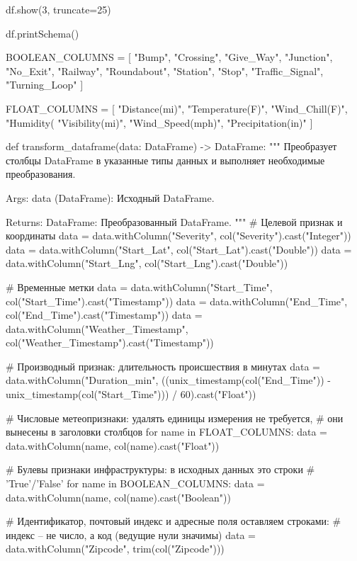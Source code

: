 \begin{code}
df.show(3, truncate=25)

df.printSchema()

BOOLEAN_COLUMNS = [
    "Bump", "Crossing", "Give_Way", "Junction", "No_Exit", "Railway", "Roundabout",
    "Station", "Stop", "Traffic_Signal", "Turning_Loop"
]

FLOAT_COLUMNS = [
    "Distance(mi)", "Temperature(F)", "Wind_Chill(F)", "Humidity(%
    "Visibility(mi)", "Wind_Speed(mph)", "Precipitation(in)"
]

def transform_dataframe(data: DataFrame) -> DataFrame:
    """
    Преобразует столбцы DataFrame в указанные типы данных и
    выполняет необходимые преобразования.

    Args:
        data (DataFrame): Исходный DataFrame.

    Returns:
        DataFrame: Преобразованный DataFrame.
    """
    # Целевой признак и координаты
    data = data.withColumn("Severity",
                           col("Severity").cast("Integer"))
    data = data.withColumn("Start_Lat",
                           col("Start_Lat").cast("Double"))
    data = data.withColumn("Start_Lng",
                           col("Start_Lng").cast("Double"))

    # Временные метки
    data = data.withColumn("Start_Time",
                           col("Start_Time").cast("Timestamp"))
    data = data.withColumn("End_Time",
                           col("End_Time").cast("Timestamp"))
    data = data.withColumn("Weather_Timestamp",
                           col("Weather_Timestamp").cast("Timestamp"))

    # Производный признак: длительность происшествия в минутах
    data = data.withColumn("Duration_min",
                           ((unix_timestamp(col("End_Time")) - unix_timestamp(col("Start_Time"))) / 60).cast("Float"))

    # Числовые метеопризнаки: удалять единицы измерения не требуется,
    # они вынесены в заголовки столбцов
    for name in FLOAT_COLUMNS:
        data = data.withColumn(name, col(name).cast("Float"))

    # Булевы признаки инфраструктуры: в исходных данных это строки
    # 'True'/'False'
    for name in BOOLEAN_COLUMNS:
        data = data.withColumn(name, col(name).cast("Boolean"))

    # Идентификатор, почтовый индекс и адресные поля оставляем строками:
    # индекс -- не число, а код (ведущие нули значимы)
    data = data.withColumn("Zipcode",
                           trim(col("Zipcode")))


\end{code}
